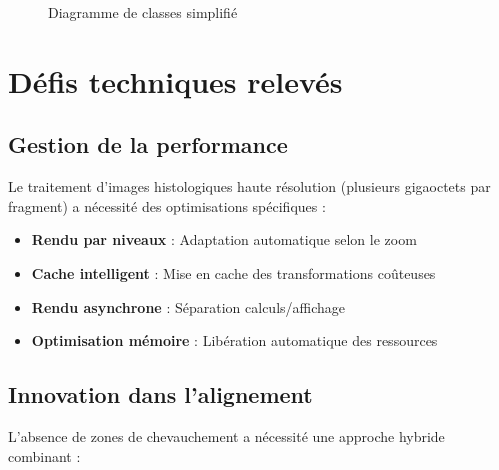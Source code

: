 \documentclass[11pt,a4paper]{report}
\begin{document}
\begin{figure}[htbp]
\caption{Diagramme de classes simplifié}
\end{figure}

\section{Défis techniques relevés}

\subsection{Gestion de la performance}

Le traitement d'images histologiques haute résolution (plusieurs gigaoctets par fragment) a nécessité des optimisations spécifiques :

\begin{itemize}
\item \textbf{Rendu par niveaux} : Adaptation automatique selon le zoom
\item \textbf{Cache intelligent} : Mise en cache des transformations coûteuses
\item \textbf{Rendu asynchrone} : Séparation calculs/affichage
\item \textbf{Optimisation mémoire} : Libération automatique des ressources
\end{itemize}

\subsection{Innovation dans l'alignement}

L'absence de zones de chevauchement a nécessité une approche hybride combinant :
\end{document}
